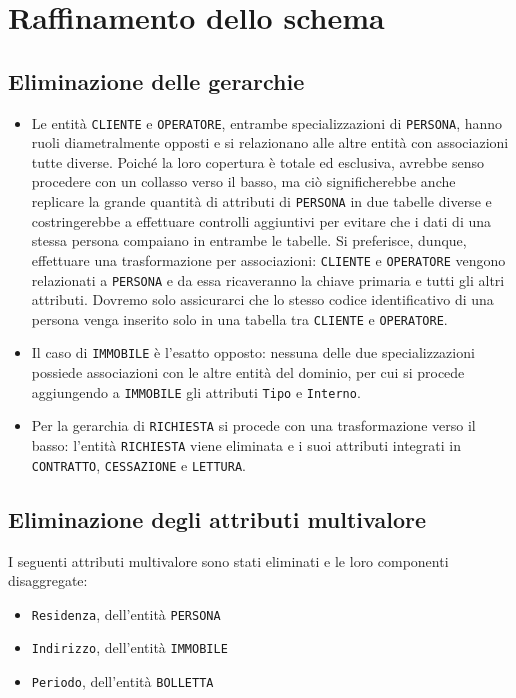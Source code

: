 \documentclass[a4paper,12pt]{report}
\begin{document}
\section{Raffinamento dello schema}
\subsection{Eliminazione delle gerarchie}
\begin{itemize}
    \item Le entità \texttt{CLIENTE} e \texttt{OPERATORE}, entrambe specializzazioni di \texttt{PERSONA}, hanno ruoli diametralmente opposti e si relazionano alle altre entità con associazioni tutte diverse. Poiché la loro copertura è totale ed esclusiva, avrebbe senso procedere con un collasso verso il basso, ma ciò significherebbe anche replicare la grande quantità di attributi di \texttt{PERSONA} in due tabelle diverse e costringerebbe a effettuare controlli aggiuntivi per evitare che i dati di una stessa persona compaiano in entrambe le tabelle. Si preferisce, dunque, effettuare una trasformazione per associazioni: \texttt{CLIENTE} e \texttt{OPERATORE} vengono relazionati a \texttt{PERSONA} e da essa ricaveranno la chiave primaria e tutti gli altri attributi. Dovremo solo assicurarci che lo stesso codice identificativo di una persona venga inserito solo in una tabella tra \texttt{CLIENTE} e \texttt{OPERATORE}.
    \item Il caso di \texttt{IMMOBILE} è l'esatto opposto: nessuna delle due specializzazioni possiede associazioni con le altre entità del dominio, per cui si procede aggiungendo a \texttt{IMMOBILE} gli attributi \texttt{Tipo} e \texttt{Interno}.
    \item Per la gerarchia di \texttt{RICHIESTA} si procede con una trasformazione verso il basso: l'entità \texttt{RICHIESTA} viene eliminata e i suoi attributi integrati in \texttt{CONTRATTO}, \texttt{CESSAZIONE} e \texttt{LETTURA}.
\end{itemize}

\subsection{Eliminazione degli attributi multivalore}
I seguenti attributi multivalore sono stati eliminati e le loro componenti disaggregate:
\begin{itemize}
    \item \texttt{Residenza}, dell'entità \texttt{PERSONA}
    \item \texttt{Indirizzo}, dell'entità \texttt{IMMOBILE}
    \item \texttt{Periodo}, dell'entità \texttt{BOLLETTA}
\end{itemize}
\end{document}
